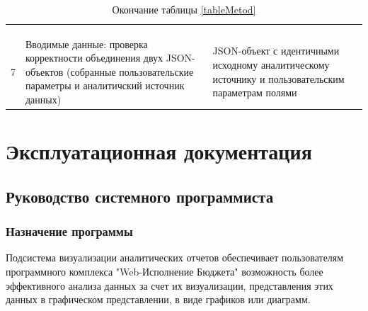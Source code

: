 \documentclass[a4paper]{extarticle}
\numberwithin{equation}{section}
\begin{document}
\begin{longtable}[H]{|c|p{}|p{}|}
  \multicolumn{3}{l}{}\\\multicolumn{3}{l}{}\\
  \caption*{Окончание таблицы \ref{tableMetod}} \\\hline
  7  & Вводимые данные: проверка корректности объединения двух JSON-объектов (собранные пользовательские параметры и аналитичский источник данных) & JSON-объект с идентичными исходному аналитическому источнику и пользовательским параметрам полями \\\hline
\end{longtable}\par

\newpage
\section{Эксплуатационная документация}

\subsection{Руководство системного программиста}

\subsubsection{Назначение программы}
Подсистема визуализации аналитических отчетов обеспечивает пользователям программного комплекса "Web-Исполнение Бюджета" возможность более эффективного анализа данных за счет их визуализации, представления этих данных в графическом представлении, в виде графиков или диаграмм.
\end{document}
